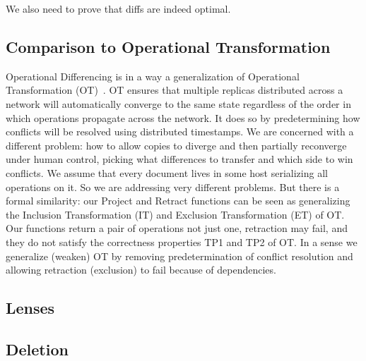 \documentclass[english,submission]{programming}
\theoremstyle{definition}
\begin{document}
We also need to prove that diffs are indeed optimal.


\subsection{Comparison to Operational Transformation}

Operational Differencing is in a way a generalization of Operational Transformation (OT)~\cite{Ellis89, Ressel96, Oster06}.
OT ensures that multiple replicas distributed across a network will automatically converge to the same state regardless of the order in which operations propagate across the network. It does so by predetermining how conflicts will be resolved using distributed timestamps. We are concerned with a different problem: how to allow copies to diverge and then partially reconverge under human control, picking what differences to transfer and which side to win conflicts. We assume that every document lives in some host serializing all operations on it. So we are addressing very different problems. But there is a formal similarity: our Project and Retract functions can be seen as generalizing the Inclusion Transformation (IT) and Exclusion Transformation (ET) of OT. Our functions return a pair of operations not just one, retraction may fail, and they do not satisfy the correctness properties TP1 and TP2 of OT. In a sense we generalize (weaken) OT by removing predetermination of conflict resolution and allowing retraction (exclusion) to fail because of dependencies.


\subsection{Lenses}

\subsection{Deletion}

\end{document}
